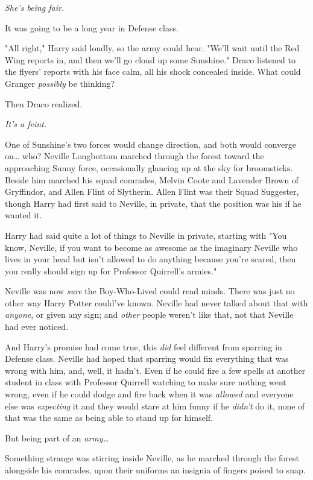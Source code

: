 \emph{She's being fair.}

It was going to be a long year in Defense class.

"All right," Harry said loudly, so the army could hear. "We'll wait until the 
Red Wing reports in, and then we'll go cloud up some Sunshine."
\sbreak
Draco listened to the flyers' reports with his face calm, all his shock 
concealed inside. What could Granger \emph{possibly} be thinking?

Then Draco realized.

\emph{It's a feint.}

One of Sunshine's two forces would change direction, and both would converge 
on{\ldots} who?
\sbreak
Neville Longbottom marched through the forest toward the approaching Sunny 
force, occasionally glancing up at the sky for broomsticks. Beside him marched 
his squad comrades, Melvin Coote and Lavender Brown of Gryffindor, and Allen 
Flint of Slytherin. Allen Flint was their Squad Suggester, though Harry had 
first said to Neville, in private, that the position was his if he wanted it.

Harry had said quite a lot of things to Neville in private, starting with "You 
know, Neville, if you want to become as awesome as the imaginary Neville who 
lives in your head but isn't allowed to do anything because you're scared, then 
you really should sign up for Professor Quirrell's armies."

Neville was now \emph{sure} the Boy-Who-Lived could read minds. There was just 
no other way Harry Potter could've known. Neville had never talked about that 
with \emph{anyone}, or given any sign; and \emph{other} people weren't like 
that, not that Neville had ever noticed.

And Harry's promise had come true, this \emph{did} feel different from sparring 
in Defense class. Neville had hoped that sparring would fix everything that was 
wrong with him, and, well, it hadn't. Even if he could fire a few spells at 
another student in class with Professor Quirrell watching to make sure nothing 
went wrong, even if he could dodge and fire back when it was \emph{allowed} and 
everyone else was \emph{expecting} it and they would stare at him funny if he 
\emph{didn't} do it, none of that was the same as being able to stand up for 
himself.

But being part of an \emph{army{\ldots}}

Something strange was stirring inside Neville, as he marched through the forest 
alongside his comrades, upon their uniforms an insignia of fingers poised to 
snap.

